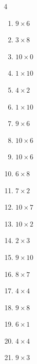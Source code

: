 \begin{multicols}{4}
\begin{enumerate}
  \item $9\times 6$
        \phantom{$=54$}

  \item $3\times 8$
        \phantom{$=24$}

  \item $10\times 0$
        \phantom{$=0$}

  \item $1\times 10$
        \phantom{$=10$}

  \item $4\times 2$
        \phantom{$=8$}

  \item $1\times 10$
        \phantom{$=10$}

  \item $9\times 6$
        \phantom{$=54$}

  \item $10\times 6$
        \phantom{$=60$}

  \item $10\times 6$
        \phantom{$=60$}

  \item $6\times 8$
        \phantom{$=48$}

  \item $7\times 2$
        \phantom{$=14$}

  \item $10\times 7$
        \phantom{$=70$}

  \item $10\times 2$
        \phantom{$=20$}

  \item $2\times 3$
        \phantom{$=6$}

  \item $9\times 10$
        \phantom{$=90$}

  \item $8\times 7$
        \phantom{$=56$}

  \item $4\times 4$
        \phantom{$=16$}

  \item $9\times 8$
        \phantom{$=72$}

  \item $6\times 1$
        \phantom{$=6$}

  \item $4\times 4$
        \phantom{$=16$}

  \item $9\times 3$
        \phantom{$=27$}


\end{enumerate}
\end{multicols}

